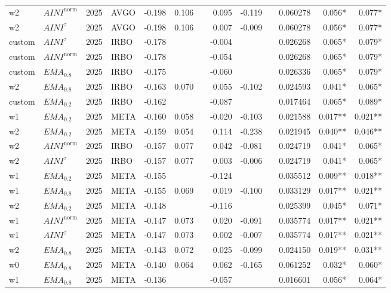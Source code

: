 \begin{longtable}{@{}llllrrrrrrrrr@{}}
w2 & $AINI^{\mathrm{norm}}$ & 2025 & AVGO & -0.198 & 0.106 &  & 0.095 & -0.119 &  & 0.060278 & 0.056* & 0.077* \\
w2 & $AINI^{z}$ & 2025 & AVGO & -0.198 & 0.106 &  & 0.007 & -0.009 &  & 0.060278 & 0.056* & 0.077* \\
custom & $AINI^{z}$ & 2025 & IRBO & -0.178 &  &  & -0.004 &  &  & 0.026268 & 0.065* & 0.079* \\
custom & $AINI^{\mathrm{norm}}$ & 2025 & IRBO & -0.178 &  &  & -0.054 &  &  & 0.026268 & 0.065* & 0.079* \\
custom & $EMA_{0.8}$ & 2025 & IRBO & -0.175 &  &  & -0.060 &  &  & 0.026336 & 0.065* & 0.079* \\
w2 & $EMA_{0.8}$ & 2025 & IRBO & -0.163 & 0.070 &  & 0.055 & -0.102 &  & 0.024593 & 0.041* & 0.065* \\
custom & $EMA_{0.2}$ & 2025 & IRBO & -0.162 &  &  & -0.087 &  &  & 0.017464 & 0.065* & 0.089* \\
w1 & $EMA_{0.2}$ & 2025 & META & -0.160 & 0.058 &  & -0.020 & -0.103 &  & 0.021588 & 0.017** & 0.021** \\
w2 & $EMA_{0.2}$ & 2025 & META & -0.159 & 0.054 &  & 0.114 & -0.238 &  & 0.021945 & 0.040** & 0.046** \\
w2 & $AINI^{\mathrm{norm}}$ & 2025 & IRBO & -0.157 & 0.077 &  & 0.042 & -0.081 &  & 0.024719 & 0.041* & 0.065* \\
w2 & $AINI^{z}$ & 2025 & IRBO & -0.157 & 0.077 &  & 0.003 & -0.006 &  & 0.024719 & 0.041* & 0.065* \\
w1 & $EMA_{0.2}$ & 2025 & META & -0.155 &  &  & -0.124 &  &  & 0.035512 & 0.009** & 0.018** \\
w1 & $EMA_{0.8}$ & 2025 & META & -0.155 & 0.069 &  & 0.019 & -0.100 &  & 0.033129 & 0.017** & 0.021** \\
w2 & $EMA_{0.2}$ & 2025 & META & -0.148 &  &  & -0.116 &  &  & 0.025399 & 0.045* & 0.071* \\
w1 & $AINI^{\mathrm{norm}}$ & 2025 & META & -0.147 & 0.073 &  & 0.020 & -0.091 &  & 0.035774 & 0.017** & 0.021** \\
w1 & $AINI^{z}$ & 2025 & META & -0.147 & 0.073 &  & 0.002 & -0.007 &  & 0.035774 & 0.017** & 0.021** \\
w2 & $EMA_{0.8}$ & 2025 & META & -0.143 & 0.072 &  & 0.025 & -0.099 &  & 0.024150 & 0.019** & 0.031** \\
w0 & $EMA_{0.8}$ & 2025 & META & -0.140 & 0.064 &  & 0.062 & -0.165 &  & 0.061252 & 0.032* & 0.060* \\
w1 & $EMA_{0.8}$ & 2025 & META & -0.136 &  &  & -0.057 &  &  & 0.016601 & 0.056* & 0.064* \\

\end{longtable}
